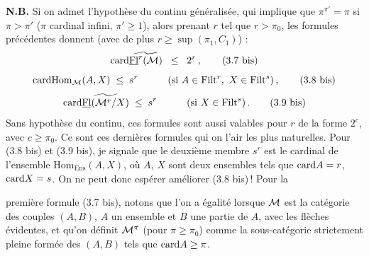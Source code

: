 \textbf{N.B.} Si on admet l'hypothèse du continu généralisée, qui implique que $\pi^{\pi'}=\pi$ si $\pi>\pi'$ ($\pi$ cardinal infini, $\pi'\geq1$), alors prenant $r$ tel que $r>\pi_0$, les formules précédentes donnent (avec de plus $r\geq\sup(\pi_1,C_1)$) :
\[
\card\widetilde{\uFl^r(\cM)} \;\;\leq\;\; 2^r\,,
\tag*{(3.7 bis)}
\]
\[
\card\mathrm{Hom}_{\cM}(A,X) \;\leq\; s^r \qquad\quad (\text{si } A\in\Filt^r,\ X\in\Filt^s)\,,
\tag*{(3.8 bis)}
\]
\[
\card\widetilde{\uFl(\cM^r/X)} \;\leq\; s^r \qquad\quad (\text{si } X\in\Filt^s)\,.
\tag*{(3.9 bis)}
\]
Sans hypothèse du continu, ces formules sont aussi valables pour $r$ de la forme $2^c$, avec $c\geq\pi_0$. Ce sont ces dernières formules qui on l'air les plus naturelles. Pour (3.8 bis) et %
(3.9 bis), je signale que le deuxième membre $s^r$ est le cardinal de l'ensemble $\mathrm{Hom}_{\mathrm{Ens}}(A,X)$, où $A$, $X$ sont deux ensembles tels que $\mathrm{card} A=r$, $\mathrm{card} X=s$. On ne peut donc espérer améliorer (3.8 bis)\,! Pour la

première formule (3.7 bis), notons que l'on a égalité lorsque $\mathcal{M}$ est la catégorie des couples $(A,B)$, $A$ un ensemble et $B$ une partie de $A$, avec les flèches évidentes, et qu'on définit $\mathcal{M}^\pi$ (pour $\pi\geq\pi_0$) comme la sous-catégorie strictement pleine formée des $(A,B)$ tels que $\mathrm{card} A\geq\pi$.

